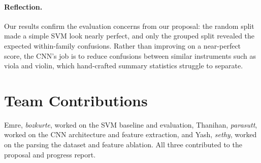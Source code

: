 \documentclass[11pt]{article}
\begin{document}
\paragraph{Reflection.} Our results confirm the evaluation concerns from our proposal: the random split made a simple SVM look nearly perfect, and only the grouped split revealed the expected within-family confusions. Rather than improving on a near-perfect score, the CNN's job is to reduce confusions between similar instruments such as viola and violin, which hand-crafted summary statistics struggle to separate.

\section*{Team Contributions}

Emre, \textit{bozkurte}, worked on the SVM baseline and evaluation, Thanihan, \textit{parasutt}, worked on the CNN architecture and feature extraction, and Yash, \textit{sethy}, worked on the parsing the dataset and feature ablation. All three contributed to the proposal and progress report.


\end{document}
